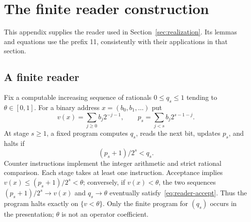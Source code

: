 \section{The finite reader construction}\label{app:reader}
This appendix supplies the reader used in Section~\ref{sec:realization}. Its lemmas and equations use the prefix 11, consistently with their applications in that section.
\renewcommand{\thetheorem}{11.\arabic{theorem}}
\renewcommand{\thelemma}{\thetheorem}
\renewcommand{\theproposition}{\thetheorem}
\renewcommand{\thecorollary}{\thetheorem}
\renewcommand{\theequation}{11.\arabic{equation}}
\subsection{A finite reader}
Fix a computable increasing sequence of rationals $0\le q_s\le1$ tending to $\theta\in[0,1]$. For a binary address $x=(b_0,b_1,\ldots)$ put
\[
 v(x)=\sum_{j\ge0}b_j2^{-j-1},\qquad
 p_s=\sum_{j<s}b_j2^{s-1-j}.
\]
At stage $s\ge1$, a fixed program computes $q_s$, reads the next bit, updates $p_s$, and halts if
\begin{equation}\label{eq:reader-accept}
 (p_s+1)/2^s<q_s.
\end{equation}
Counter instructions implement the integer arithmetic and strict rational comparison. Each stage takes at least one instruction. Acceptance implies $v(x)\le(p_s+1)/2^s<\theta$; conversely, if $v(x)<\theta$, the two sequences $(p_s+1)/2^s\to v(x)$ and $q_s\to\theta$ eventually satisfy~\eqref{eq:reader-accept}. Thus the program halts exactly on $\{v<\theta\}$. Only the finite program for $(q_s)$ occurs in the presentation; $\theta$ is not an operator coefficient.

